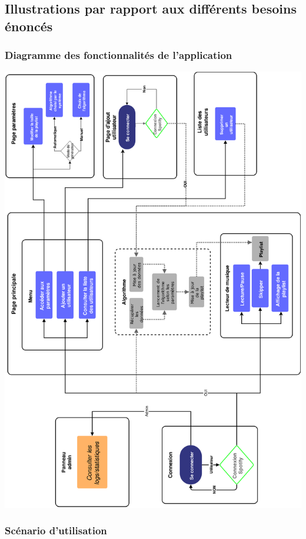 \documentclass[12pt, openany]{report}
\begin{document}
\subsection{Illustrations par rapport aux différents besoins énoncés}
 
 \subsubsection{Diagramme des fonctionnalités de l'application}
 
 \includegraphics[scale=0.11]{images/schema_fonc.png}
 
 \subsubsection{Scénario d'utilisation}
 
\end{document}
